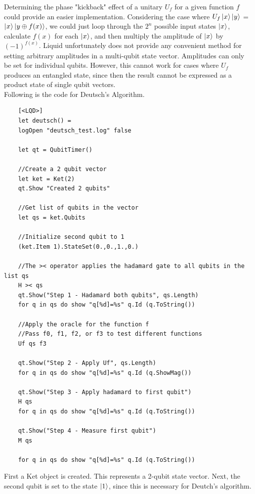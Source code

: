 \documentclass{article}
\theoremstyle{plain}
\theoremstyle{definition}
\theoremstyle{remark}
\begin{document}
Determining the phase "kickback" effect of a unitary $U_f$ for a given function $f$
could provide an easier implementation. Considering the case where $U_f\left|\mspace{0.5mu} x \mspace{0.5mu}\right\rangle\left|\mspace{0.5mu} y \mspace{0.5mu}\right\rangle$ = $\left|\mspace{0.5mu} x \mspace{0.5mu}\right\rangle\left|\mspace{0.5mu} y \oplus f(x) \mspace{0.5mu}\right\rangle$,
we could just loop through the $2^n$ possible input states $\left|\mspace{0.5mu} x \mspace{0.5mu}\right\rangle$, calculate $f(x)$ for each $\left|\mspace{0.5mu} x \mspace{0.5mu}\right\rangle$, and then
multiply the amplitude of $\left|\mspace{0.5mu} x \mspace{0.5mu}\right\rangle$ by $(-1)^{f(x)}$. Liquid unfortunately does not provide any convenient method for
setting arbitrary amplitudes in a multi-qubit state vector. Amplitudes can only be set for individual qubits. However, this
cannot work for cases where $U_f$ produces an entangled state, since then the result cannot be expressed as a product state
of single qubit vectors. \\


Following is the code for Deutsch's Algorithm.

\pagebreak

\begin{lstlisting}
    [<LQD>]
    let deutsch() =
    logOpen "deutsch_test.log" false

    let qt = QubitTimer()

    //Create a 2 qubit vector
    let ket = Ket(2)
    qt.Show "Created 2 qubits"

    //Get list of qubits in the vector
    let qs = ket.Qubits

    //Initialize second qubit to 1
    (ket.Item 1).StateSet(0.,0.,1.,0.)

    //The >< operator applies the hadamard gate to all qubits in the list qs
    H >< qs
    qt.Show("Step 1 - Hadamard both qubits", qs.Length)
    for q in qs do show "q[%d]=%s" q.Id (q.ToString())

    //Apply the oracle for the function f
    //Pass f0, f1, f2, or f3 to test different functions
    Uf qs f3

    qt.Show("Step 2 - Apply Uf", qs.Length)
    for q in qs do show "q[%d]=%s" q.Id (q.ShowMag())

    qt.Show("Step 3 - Apply hadamard to first qubit")
    H qs
    for q in qs do show "q[%d]=%s" q.Id (q.ToString())

    qt.Show("Step 4 - Measure first qubit")
    M qs

    for q in qs do show "q[%d]=%s" q.Id (q.ToString())
\end{lstlisting}

First a Ket object is created. This represents a 2-qubit state vector. Next, the
second qubit is set to the state $\left|\mspace{0.5mu} 1 \mspace{0.5mu}\right\rangle$, since this is necessary for Deutch's algorithm.\\
\end{document}
